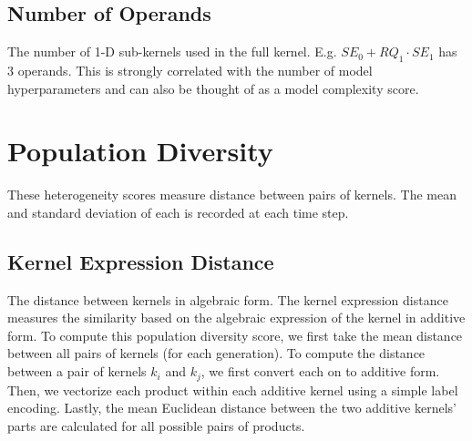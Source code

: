 \documentclass{article}
\begin{document}
\subsection{Number of Operands}\label{subsec:number-of-operands}
The number of 1-D sub-kernels used in the full kernel.
E.g. $SE_0 + RQ_1 \cdot SE_1$ has 3 operands.
This is strongly correlated with the number of model hyperparameters and can also be thought of as a model complexity score.
\section{Population Diversity}\label{sec:population-diversity}
These heterogeneity scores measure distance between pairs of kernels.
The mean and standard deviation of each is recorded at each time step.
\subsection{Kernel Expression Distance}\label{subsec:kernel-expression-distance}
The distance between kernels in algebraic form.
The kernel expression distance measures the similarity based on the algebraic expression of the kernel in additive form.
To compute this population diversity score, we first take the mean distance between all pairs of kernels (for each generation).
To compute the distance between a pair of kernels $k_i$ and $k_j$, we first convert each on to additive form.
Then, we vectorize each product within each additive kernel using a simple label encoding.
Lastly, the mean Euclidean distance between the two additive kernels' parts are calculated for all possible pairs of products.
\end{document}
